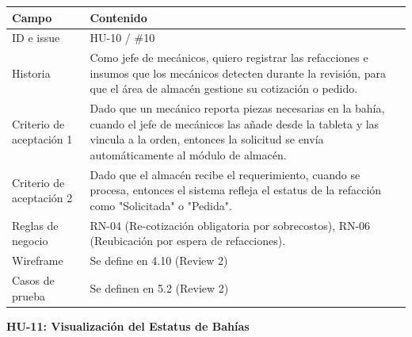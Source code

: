 {\def\LTcaptype{none} %
\begin{longtable}[]{@{}
  >{\raggedright\arraybackslash}p{}
  >{\raggedright\arraybackslash}p{}@{}}
\toprule\noalign{}
\begin{minipage}[b]{\linewidth}\raggedright
\textbf{Campo}
\end{minipage} & \begin{minipage}[b]{\linewidth}\raggedright
\textbf{Contenido}
\end{minipage} \\
\midrule\noalign{}
\endhead
\bottomrule\noalign{}
\endlastfoot
ID e issue & HU-10 / \#10 \\
Historia & Como jefe de mecánicos, quiero registrar las refacciones e
insumos que los mecánicos detecten durante la revisión, para que el área
de almacén gestione su cotización o pedido. \\
Criterio de aceptación 1 & Dado que un mecánico reporta piezas
necesarias en la bahía, cuando el jefe de mecánicos las añade desde la
tableta y las vincula a la orden, entonces la solicitud se envía
automáticamente al módulo de almacén. \\
Criterio de aceptación 2 & Dado que el almacén recibe el requerimiento,
cuando se procesa, entonces el sistema refleja el estatus de la
refacción como "Solicitada" o "Pedida". \\
Reglas de negocio & RN-04 (Re-cotización obligatoria por sobrecostos),
RN-06 (Reubicación por espera de refacciones). \\
Wireframe & Se define en 4.10 (Review 2) \\
Casos de prueba & Se definen en 5.2 (Review 2) \\
\end{longtable}
}

\textbf{HU-11: Visualización del Estatus de Bahías}

